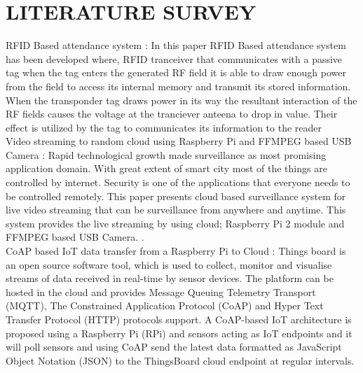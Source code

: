 \chapter{LITERATURE SURVEY}
\thispagestyle{empty}

\hspace{.2cm}  RFID Based attendance system
: In this paper RFID Based attendance system has been developed where, RFID tranceiver that communicates with a passive tag when the tag enters the generated RF field it is able to draw enough power from the field to access its internal memory and transmit its stored information. When the transponder tag draws power in its way the resultant interaction of the RF fields causes the voltage at the tranciever anteena to drop in value. Their effect is utilized by the tag to communicates its information to the reader\\

\hspace{.2cm} Video streaming to random cloud using Raspberry Pi and FFMPEG based USB Camera : Rapid technological growth made surveillance as most promising application domain. With great extent of smart city most of the things are controlled by internet. Security is one of the applications that everyone needs to be controlled remotely. This paper presents cloud based surveillance system for live video streaming that can be surveillance from anywhere and anytime. This system provides the live streaming by using cloud; Raspberry Pi 2 module and FFMPEG based USB Camera.
.\\

CoAP based IoT data transfer from a Raspberry Pi to Cloud : Things board is an  open source software tool, which is used to collect, monitor and visualise streams of data received in real-time by sensor devices. The platform can be hosted in the cloud and provides Message Queuing Telemetry Transport (MQTT), The Constrained Application Protocol (CoAP) and Hyper Text Transfer Protocol (HTTP) protocols support.  A CoAP-based IoT architecture is proposed using a Raspberry Pi (RPi) and sensors acting as IoT endpoints and it will poll sensors and using CoAP send the latest data formatted as JavaScript Object Notation (JSON) to the ThingsBoard cloud endpoint at regular intervals.
\\



